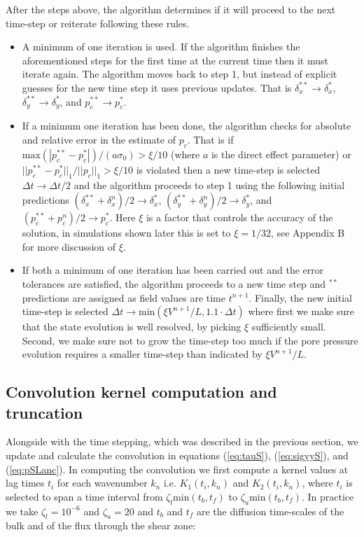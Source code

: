 \documentclass[draft]{agujournal2019}
\begin{document}
After the steps above, the algorithm determines if it will proceed to the next time-step or reiterate following these rules.

\begin{itemize}

    \item A minimum of one iteration is used. If the algorithm finishes the aforementioned steps for the first time at the current time then it must iterate again. The algorithm moves back to step 1, but instead of explicit guesses for the new time step it uses previous updates. That is $\delta_x^{**} \rightarrow \delta_x^{*}$, $\delta_y^{**} \rightarrow \delta_y^{*}$, and $p_c^{**} \rightarrow p_c^{*}$.
    \item If a minimum one iteration has been done, the algorithm checks for absolute and relative error in the estimate of $p_c$. That is if $\text{max} (|p_c^{**} - p_c^*|)/(a \sigma_0) > \xi/10$ (where $a$ is the direct effect parameter)  or $||p_c^{**} - p_c^*||_1/||p_c||_1 > \xi/10$ is violated then a new time-step is selected $\Delta t \rightarrow \Delta t /2$ and the algorithm proceeds to step 1 using the following initial predictions $(\delta_x^{**} + \delta_x^{n})/2 \rightarrow \delta_x^{*}$, $(\delta_y^{**} + \delta_y^{n})/2 \rightarrow \delta_y^{*}$, and $(p_c^{**} + p_c^n)/2 \rightarrow p_c^{*}$. Here $\xi$ is a factor that controls the accuracy of the solution, in simulations shown later this is set to $\xi = 1/32$, see Appendix B for more discussion of $\xi$.
    \item If both a minimum of one iteration has been carried out and the error tolerances are satisfied, the algorithm proceeds to a new time step and $^{**}$ predictions are assigned as field values are time $t^{n+1}$. Finally, the new initial time-step is selected $\Delta t \rightarrow \text{min} (\xi V^{n+1}/L , 1.1 \cdot \Delta t )$ where first we make sure that the state evolution is well resolved, by picking $\xi$ sufficiently small. Second, we make sure not to grow the time-step too much if the pore pressure evolution requires a smaller time-step than indicated by $\xi V^{n+1}/L$.
\end{itemize}


\subsection{Convolution kernel computation and truncation}

Alongside with the time stepping, which was described in the previous section, we update and calculate the convolution in equations (\ref{eq:tauS}), (\ref{eq:sigyyS}), and (\ref{eq:pSLanc}). In computing the convolution we first compute a kernel values at lag times $t_i$ for each wavenumber $k_n$ i.e. $K_1(t_i,k_n)$ and $K_2(t_i,k_n)$, where $t_i$ is selected to span a time interval from $\zeta_l \text{min} (t_b, t_f)$ to $\zeta_u \text{min} (t_b, t_f)$. In practice we take $\zeta_l = 10^{-6}$ and $\zeta_u = 20$ and $t_b$ and $t_f$ are the diffusion time-scales of the bulk and of the flux through the shear zone:
\end{document}
